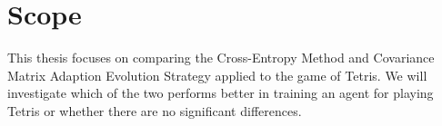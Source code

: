 \section*{Scope}
This thesis focuses on comparing the Cross-Entropy Method and
Covariance Matrix Adaption Evolution Strategy applied to the game of Tetris. We will investigate 
which of the two performs better in training an agent for playing Tetris or whether there are no significant differences.

